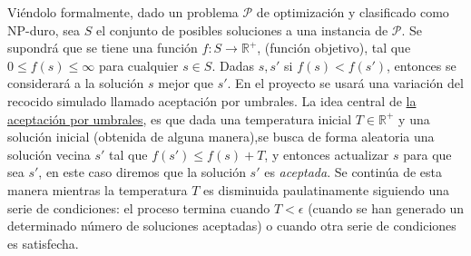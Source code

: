 \documentclass{article}
\begin{document}
Viéndolo formalmente, dado un problema $\mathscr{P}$ de optimización y clasificado como NP-duro, sea $S$ el conjunto de posibles soluciones a una instancia de $\mathscr{P}$. Se supondrá que se tiene una función $f: S \to \mathds{R}^+$, (función objetivo), tal que $0 \leq f(s) \leq \infty$ para cualquier $s \in S$. Dadas $s,s'$ si $f(s) < f(s')$, entonces se considerará a la solución $s$ mejor que $s'$. En el proyecto se usará una variación del recocido simulado llamado aceptación por umbrales. La idea central de \underline{la aceptación por umbrales}, es que dada una temperatura inicial $T \in \mathds{R}^+$ y una solución inicial (obtenida de alguna manera),se busca de forma aleatoria una solución vecina $s'$ tal que $f(s') \leq f(s) + T$, y entonces actualizar $s$ para que sea $s'$, en este caso diremos que la solución $s'$ es \emph{aceptada}. Se continúa de esta manera mientras la temperatura $T$ es disminuida paulatinamente siguiendo una serie de condiciones: el proceso termina cuando $T < \epsilon$ (cuando se han generado un determinado número de soluciones aceptadas) o cuando otra serie de condiciones es satisfecha.
\end{document}
